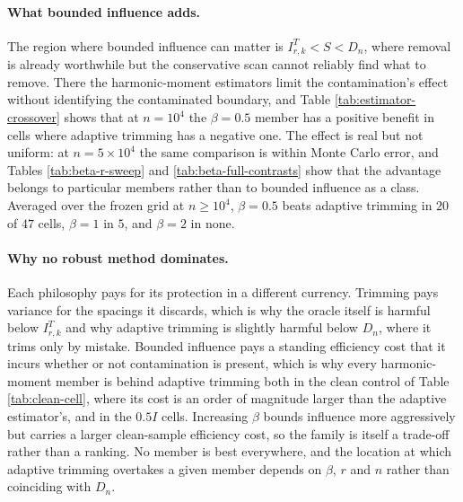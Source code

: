 \documentclass[11pt]{article}
\begin{document}
\paragraph{What bounded influence adds.}
The region where bounded influence can matter is $I^{T}_{r,k}<S<D_n$, where
removal is already worthwhile but the conservative scan cannot reliably find
what to remove.  There the harmonic-moment estimators limit the contamination's
effect without identifying the contaminated boundary, and Table
\ref{tab:estimator-crossover} shows that at $n=10^4$ the $\beta=0.5$ member has
a positive benefit in cells where adaptive trimming has a negative one.  The
effect is real but not uniform: at $n=5\times10^4$ the same comparison is
within Monte Carlo error, and Tables \ref{tab:beta-r-sweep} and
\ref{tab:beta-full-contrasts} show that the advantage belongs to particular
members rather than to bounded influence as a class.  Averaged
over the frozen grid at $n\ge10^4$, $\beta=0.5$ beats adaptive trimming in
$20$ of $47$ cells, $\beta=1$ in $5$, and $\beta=2$ in none.

\paragraph{Why no robust method dominates.}
Each philosophy pays for its protection in a different currency.  Trimming pays
variance for the spacings it discards, which is why the oracle itself is
harmful below $I^{T}_{r,k}$ and why adaptive trimming is slightly harmful below
$D_n$, where it trims only by mistake.  Bounded influence pays a standing
efficiency cost that it incurs whether or not contamination is present, which
is why every harmonic-moment member is behind adaptive trimming both in the
clean control of Table \ref{tab:clean-cell}, where its cost is an order of
magnitude larger than the adaptive estimator's, and in the $0.5I$ cells.  Increasing $\beta$ bounds influence
more aggressively but carries a larger clean-sample efficiency cost, so the
family is itself a trade-off rather than a ranking.  No member is best
everywhere, and the location at which adaptive
trimming overtakes a given member depends on $\beta$, $r$ and $n$ rather than
coinciding with $D_n$.
\end{document}
